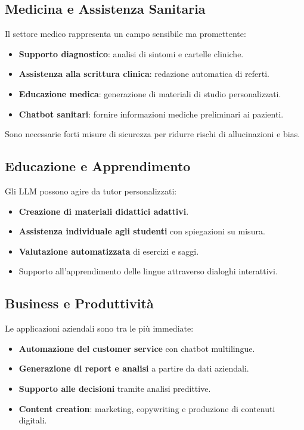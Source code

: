 \subsection{Medicina e Assistenza Sanitaria}
Il settore medico rappresenta un campo sensibile ma promettente:
\begin{itemize}
    \item \textbf{Supporto diagnostico}: analisi di sintomi e cartelle cliniche.
    \item \textbf{Assistenza alla scrittura clinica}: redazione automatica di referti.
    \item \textbf{Educazione medica}: generazione di materiali di studio personalizzati.
    \item \textbf{Chatbot sanitari}: fornire informazioni mediche preliminari ai pazienti.
\end{itemize}
Sono necessarie forti misure di sicurezza per ridurre rischi di allucinazioni e bias.

\subsection{Educazione e Apprendimento}
Gli LLM possono agire da tutor personalizzati:
\begin{itemize}
    \item \textbf{Creazione di materiali didattici adattivi}.
    \item \textbf{Assistenza individuale agli studenti} con spiegazioni su misura.
    \item \textbf{Valutazione automatizzata} di esercizi e saggi.
    \item Supporto all'apprendimento delle lingue attraverso dialoghi interattivi.
\end{itemize}

\subsection{Business e Produttività}
Le applicazioni aziendali sono tra le più immediate:
\begin{itemize}
    \item \textbf{Automazione del customer service} con chatbot multilingue.
    \item \textbf{Generazione di report e analisi} a partire da dati aziendali.
    \item \textbf{Supporto alle decisioni} tramite analisi predittive.
    \item \textbf{Content creation}: marketing, copywriting e produzione di contenuti digitali.
\end{itemize}

